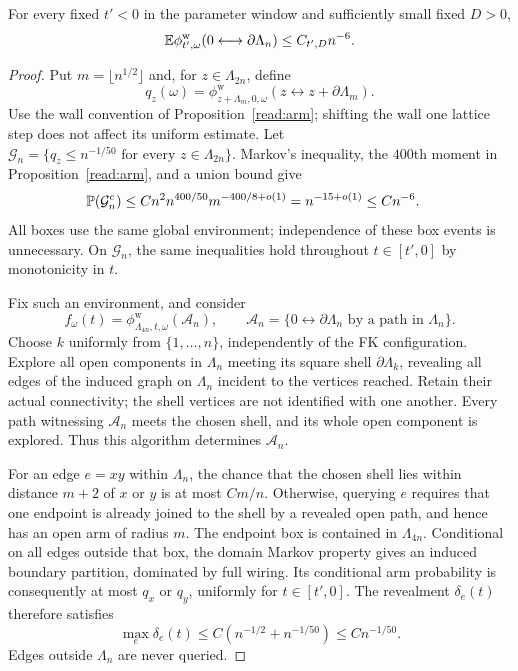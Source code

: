 \begin{lemma}\label{crit:subcritical-arm}
For every fixed $t'<0$ in the parameter window and sufficiently small
fixed $D>0$,
\begin{equation}\label{crit:subcritical-decay}
 \mathbb E\phi^{\mathrm w}_{t',\omega}
                  (0\longleftrightarrow\partial\Lambda_n)
                      \le C_{t',D}n^{-6}.
\end{equation}
\end{lemma}

\begin{proof}
Put $m=\lfloor n^{1/2}\rfloor$ and, for $z\in\Lambda_{2n}$, define
\[
 q_z(\omega)=\phi^{\mathrm w}_{z+\Lambda_m,0,\omega}
           (z\longleftrightarrow z+\partial\Lambda_m).
\]
Use the wall convention of Proposition~\ref{read:arm}; shifting the wall
one lattice step does not affect its uniform estimate.  Let
$\mathcal G_n=\{q_z\le n^{-1/50}\text{ for every }z\in\Lambda_{2n}\}$.
Markov's inequality, the $400$th moment in Proposition~\ref{read:arm},
and a union bound give
\begin{align}\label{crit:exception}
 \mathbb P(\mathcal G_n^c)
 &\le Cn^2 n^{400/50}m^{-400/8+o(1)}
   =n^{-15+o(1)}\le Cn^{-6}.
\end{align}
All boxes use the same global environment; independence of these
box events is unnecessary.  On $\mathcal G_n$, the same inequalities
hold throughout $t\in[t',0]$ by monotonicity in $t$.

Fix such an environment, and consider
\[
 f_\omega(t)=\phi^{\mathrm w}_{\Lambda_{4n},t,\omega}(\mathcal A_n),
 \qquad
 \mathcal A_n=\{0\longleftrightarrow\partial\Lambda_n
                        \text{ by a path in }\Lambda_n\}.
\]
Choose $k$ uniformly from $\{1,\ldots,n\}$, independently of the FK
configuration.  Explore all open components in $\Lambda_n$ meeting
its square shell $\partial\Lambda_k$, revealing all edges of the
induced graph on $\Lambda_n$ incident to the vertices reached.
Retain their actual connectivity; the shell
vertices are not identified with one another.  Every path witnessing
$\mathcal A_n$ meets the chosen shell, and its whole open component
is explored.  Thus this algorithm determines $\mathcal A_n$.

For an edge $e=xy$ within $\Lambda_n$, the chance that the chosen shell
lies within distance $m+2$ of $x$ or $y$ is at most $Cm/n$.  Otherwise,
querying $e$ requires that one endpoint is already joined to the shell
by a revealed open path, and hence has an open arm of radius $m$.
The endpoint box is contained in $\Lambda_{4n}$.  Conditional on all
edges outside that box, the domain Markov property gives an induced
boundary partition, dominated by full wiring.  Its conditional arm
probability is consequently at most $q_x$ or $q_y$, uniformly for
$t\in[t',0]$.  The revealment $\delta_e(t)$ therefore satisfies
\begin{equation}\label{crit:revealment}
 \max_e\delta_e(t)
          \le C(n^{-1/2}+n^{-1/50})\le Cn^{-1/50}.
\end{equation}
Edges outside $\Lambda_n$ are never queried.


\end{proof}
